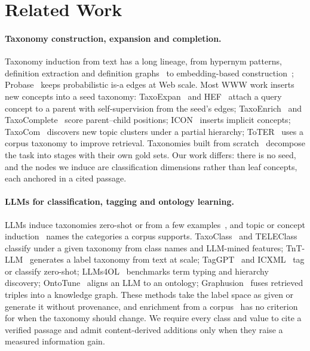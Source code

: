\section{Related Work}
\label{sec:related}

\paragraph{Taxonomy construction, expansion and completion.}
Taxonomy induction from text has a long lineage, from hypernym patterns,
definition extraction and definition graphs~\cite{hearst1992,snow2006,navigli2010,velardi2013,bordea2016}
to embedding-based construction~\cite{zhang2018taxogen,shen2018hiexpan,huang2020corel};
Probase~\cite{wu2012probase} keeps probabilistic is-a edges at Web scale.
Most WWW work inserts new concepts into a seed taxonomy:
TaxoExpan~\cite{shen2020taxoexpan} and HEF~\cite{wang2021hef} attach a query
concept to a parent with self-supervision from the seed's edges;
TaxoEnrich~\cite{jiang2022taxoenrich} and TaxoComplete~\cite{arous2023taxocomplete}
score parent--child positions; ICON~\cite{shi2024icon} inserts implicit
concepts; TaxoCom~\cite{lee2022taxocom} discovers
new topic clusters under a partial hierarchy; ToTER~\cite{kang2024toter} uses
a corpus taxonomy to improve retrieval. Taxonomies built from scratch~\cite{chu2019tifi,redi2019citation}
decompose the task into stages with their own gold sets. Our work differs:
there is no seed, and the nodes we induce are classification dimensions rather
than leaf concepts, each anchored in a cited passage.

\paragraph{LLMs for classification, tagging and ontology learning.}
LLMs induce taxonomies zero-shot or from a few examples~\cite{jain2022hypernymy,
zeng2024chainoflayer,lo2024ollm}, and topic or concept
induction~\cite{pham2024topicgpt,lam2024lloom} names the categories a corpus
supports. TaxoClass~\cite{shen2021taxoclass} and TELEClass~\cite{zhang2025teleclass}
classify under a given taxonomy from class names and LLM-mined features; TnT-LLM~\cite{wan2024tntllm} generates a label taxonomy from
text at scale; TagGPT~\cite{li2023taggpt} and ICXML~\cite{zhu2024icxml} tag or
classify zero-shot; LLMs4OL~\cite{babaeigiglou2023llms4ol} benchmarks term
typing and hierarchy discovery; OntoTune~\cite{liu2025ontotune} aligns an LLM to
an ontology; Graphusion~\cite{yang2025graphusion} fuses retrieved triples into
a knowledge graph. These methods take the label space as
given or generate it without provenance, and enrichment from a
corpus~\cite{zhang2025teleclass,lee2022taxocom} has no criterion for when the
taxonomy should change. We require every class and value to cite a verified
passage and admit content-derived additions only when they raise a measured
information gain.

